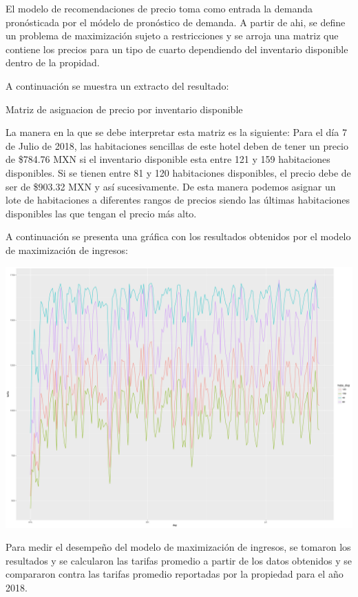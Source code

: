 El modelo de recomendaciones de precio toma como entrada la demanda pronósticada por el módelo de pronóstico de demanda. A partir de ahi, se define un problema de maximización sujeto a restricciones y se arroja una matriz que contiene los precios para un tipo de cuarto dependiendo del inventario disponible dentro de la propidad.

A continuación se muestra un extracto del resultado:

\begin{table}[H]
  \centering
  \par
  \caption{Matriz de asignacion de precio por inventario disponible}
\end{table}

La manera en la que se debe interpretar esta matriz es la siguiente: Para el día 7 de Julio de 2018, las habitaciones sencillas de este hotel deben de tener un precio de \$784.76 MXN si el inventario disponible esta entre 121 y 159 habitaciones disponibles. Si se tienen entre 81 y 120 habitaciones disponibles, el precio debe de ser de \$903.32 MXN y así sucesivamente. De esta manera podemos asignar un lote de habitaciones a diferentes rangos de precios siendo las últimas habitaciones disponibles las que tengan el precio más alto.


A continuación se presenta una gráfica con los resultados obtenidos por el modelo de maximización de ingresos:

\includegraphics[width=\maxwidth]{figures/Pricing_graph-1} 

Para medir el desempeño del modelo de maximización de ingresos, se tomaron los resultados y se calcularon las tarifas promedio a partir de los datos obtenidos y se compararon contra las tarifas promedio reportadas por la propiedad para el año 2018.


